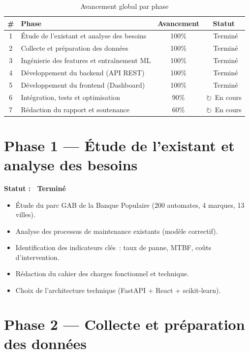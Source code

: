 \documentclass[a4paper,12pt]{report}
\newcommand{\done}{\textcolor{done}{\checkmark\ Terminé}}
\newcommand{\inprog}{\textcolor{inprogress}{$\circlearrowright$\ En cours}}
\begin{document}
\begin{table}[h!]
\centering
\renewcommand{\arraystretch}{1.5}
\begin{tabularx}{\textwidth}{|c|X|c|c|}
\hline
\rowcolor{bpmblue!10}
\textbf{\#} & \textbf{Phase} & \textbf{Avancement} & \textbf{Statut} \\
\hline
1 & Étude de l'existant et analyse des besoins & 100\% & \done \\
\hline
2 & Collecte et préparation des données & 100\% & \done \\
\hline
3 & Ingénierie des features et entraînement ML & 100\% & \done \\
\hline
4 & Développement du backend (API REST) & 100\% & \done \\
\hline
5 & Développement du frontend (Dashboard) & 100\% & \done \\
\hline
6 & Intégration, tests et optimisation & 90\% & \inprog \\
\hline
7 & Rédaction du rapport et soutenance & 60\% & \inprog \\
\hline
\end{tabularx}
\caption{Avancement global par phase}
\end{table}

\section{Phase 1 — Étude de l'existant et analyse des besoins}

\textbf{Statut : \done}

\begin{itemize}
    \item Étude du parc GAB de la Banque Populaire (200 automates, 4 marques, 13 villes).
    \item Analyse des processus de maintenance existants (modèle correctif).
    \item Identification des indicateurs clés~: taux de panne, MTBF, coûts d'intervention.
    \item Rédaction du cahier des charges fonctionnel et technique.
    \item Choix de l'architecture technique (FastAPI + React + scikit-learn).
\end{itemize}

\section{Phase 2 — Collecte et préparation des données}
\end{document}
